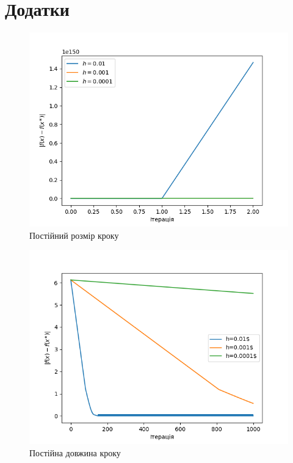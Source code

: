 \documentclass[a4paper, 14pt]{extarticle}
\begin{document}
\section{Додатки}
\begin{figure}[h]
    \centering
    \caption{Постійний розмір кроку}
    \includegraphics{const_size.png}
\end{figure}
\begin{figure}[h]
    \centering
    \caption{Постійна довжина кроку}
    \includegraphics{const_len.png}
\end{figure}
\end{document}
